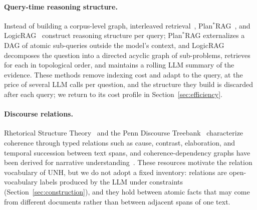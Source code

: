 \documentclass[runningheads]{llncs}
\newcommand{\sys}{UNH}
\begin{document}
\paragraph{Query-time reasoning structure.}
Instead of building a corpus-level graph, interleaved retrieval~\cite{trivedi2023interleaving}, Plan$^{*}$RAG~\cite{verma2025planrag}, and LogicRAG~\cite{chen2026logicrag} construct reasoning structure per query; Plan$^{*}$RAG externalizes a DAG of atomic sub-queries outside the model's context, and LogicRAG decomposes the question into a directed acyclic graph of sub-problems, retrieves for each in topological order, and maintains a rolling LLM summary of the evidence. These methods remove indexing cost and adapt to the query, at the price of several LLM calls per question, and the structure they build is discarded after each query; we return to its cost profile in Section~\ref{sec:efficiency}.

\paragraph{Discourse relations.}
Rhetorical Structure Theory~\cite{mann1988rhetorical} and the Penn Discourse Treebank~\cite{prasad2017penn} characterize coherence through typed relations such as cause, contrast, elaboration, and temporal succession between text spans, and coherence-dependency graphs have been derived for narrative understanding~\cite{xu2024graph,santana2023survey}. These resources motivate the relation vocabulary of \sys{}, but we do not adopt a fixed inventory: relations are open-vocabulary labels produced by the LLM under constraints (Section~\ref{sec:construction}), and they hold between atomic facts that may come from different documents rather than between adjacent spans of one text.
\end{document}
